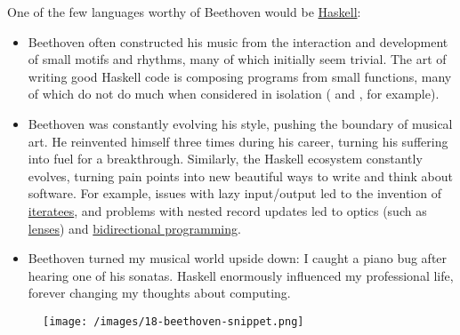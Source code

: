 \documentclass{article}
\begin{document}
One of the few languages worthy of Beethoven would be \href{https://www.haskell.org/}{Haskell}:
\begin{itemize}
  \item
  Beethoven often constructed his music from the interaction and development of small motifs and rhythms, many of which initially seem trivial.
  The art of writing good Haskell code is composing programs from small functions, many of which do not do much when considered in isolation (\href{https://hackage.haskell.org/package/base-4.18.0.0/docs/Prelude.html#v:id}{} and \href{https://hackage.haskell.org/package/base-4.18.0.0/docs/Data-Function.html#v:fix}{}, for example).
  \item
  Beethoven was constantly evolving his style, pushing the boundary of musical art.
  He reinvented himself three times during his career, turning his suffering into fuel for a breakthrough.
  Similarly, the Haskell ecosystem constantly evolves, turning pain points into new beautiful ways to write and think about software.
  For example, issues with lazy input/output led to the invention of \href{https://wiki.haskell.org/Iteratee_I/O}{iteratees}, and problems with nested record updates led to optics (such as \href{https://www.youtube.com/watch?v=k-QwBL9Dia0}{lenses}) and \href{https://www.cis.upenn.edu/~bcpierce/papers/icmt-2009-slides.pdf}{bidirectional programming}.
  \item
  Beethoven turned my musical world upside down: I caught a piano bug after hearing one of his sonatas.
  Haskell enormously influenced my professional life, forever changing my thoughts about computing.
\end{itemize}

\begin{figure}[grayscale-diagram]
  \texttt{[image: /images/18-beethoven-snippet.png]}
\end{figure}
\end{document}
